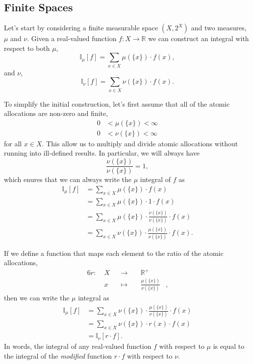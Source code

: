 \documentclass[
  letterpaper,
  DIV=11,
  numbers=noendperiod]{scrartcl}
\begin{document}
\subsection{Finite Spaces}\label{sec:finite_densities}

Let's start by considering a finite measurable space \((X, 2^{X})\) and
two measures, \(\mu\) and \(\nu\). Given a real-valued function
\(f: X \rightarrow \mathbb{R}\) we can construct an integral with
respect to both \(\mu\), \[
\mathbb{I}_{\mu}[f] = \sum_{x \in X} \mu( \{ x \} ) \cdot f(x),
\] and \(\nu\), \[
\mathbb{I}_{\nu}[f] = \sum_{x \in X} \nu( \{ x \} ) \cdot f(x).
\]

To simplify the initial construction, let's first assume that all of the
atomic allocations are non-zero and finite, \begin{align*}
0 &< \mu( \{ x \} ) < \infty
\\
0 &< \nu( \{ x \} ) < \infty
\end{align*} for all \(x \in X\). This allow us to multiply and divide
atomic allocations without running into ill-defined results. In
particular, we will always have \[
\frac{ \nu( \{ x \} )}{ \nu( \{ x \} )} = 1,
\] which enures that we can always write the \(\mu\) integral of \(f\)
as \begin{align*}
\mathbb{I}_{\mu}[f]
&=
\sum_{x \in X} \mu( \{ x \} ) \cdot f(x)
\\
&=
\sum_{x \in X} \mu( \{ x \} ) \cdot 1 \cdot f(x)
\\
&=
\sum_{x \in X} \mu( \{ x \} ) \cdot
\frac{ \nu( \{ x \} )}{ \nu( \{ x \} )} \cdot
f(x)
\\
&=
\sum_{x \in X} \nu( \{ x \} ) \cdot
\frac{ \mu( \{ x \} )}{ \nu( \{ x \} )} \cdot
f(x).
\end{align*}

If we define a function that maps each element to the ratio of the
atomic allocations, \begin{alignat*}{6}
r :\; & X & &\rightarrow& \; & \mathbb{R}^{+} &
\\
& x & &\mapsto& & \frac{ \mu( \{ x \} )}{ \nu( \{ x \} )} &,
\end{alignat*} then we can write the \(\mu\) integral as \begin{align*}
\mathbb{I}_{\mu}[f]
&=
\sum_{x \in X} \nu( \{ x \} ) \cdot
\frac{ \mu( \{ x \} )}{ \nu( \{ x \} )} \cdot f(x)
\\
&=
\sum_{x \in X} \nu( \{ x \} ) \cdot r(x) \cdot f(x)
\\
&=
\mathbb{I}_{\nu} [ r \cdot f ].
\end{align*} In words, the integral of any real-valued function \(f\)
with respect to \(\mu\) is equal to the integral of the \emph{modified}
function \(r \cdot f\) with respect to \(\nu\).
\end{document}
